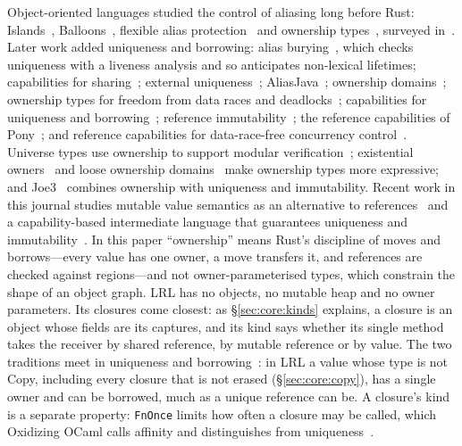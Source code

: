 Object-oriented languages studied the control of aliasing long before Rust: Islands~\cite{hogg1991islands}, Balloons~\cite{almeida1997balloon}, flexible alias protection~\cite{noble1998flexible} and ownership types~\cite{clarke1998ownership}, surveyed in~\cite{clarke2013survey}.
Later work added uniqueness and borrowing: alias burying~\cite{boyland2001burying}, which checks uniqueness with a liveness analysis and so anticipates non-lexical lifetimes; capabilities for sharing~\cite{boyland2001capabilities}; external uniqueness~\cite{clarke2003external}; AliasJava~\cite{aldrich2002alias}; ownership domains~\cite{aldrich2004domains}; ownership types for freedom from data races and deadlocks~\cite{boyapati2002ownership}; capabilities for uniqueness and borrowing~\cite{haller2010capabilities}; reference immutability~\cite{gordon2012uniqueness}; the reference capabilities of Pony~\cite{clebsch2015deny}; and reference capabilities for data-race-free concurrency control~\cite{castegren2016reference}.
Universe types use ownership to support modular verification~\cite{muller2002modular,dietl2005universes,dietl2007generic}; existential owners~\cite{wrigstad2007existential} and loose ownership domains~\cite{schaefer2007loose} make ownership types more expressive; and Joe3~\cite{ostlund2008ownership} combines ownership with uniqueness and immutability.
Recent work in this journal studies mutable value semantics as an alternative to references~\cite{racordon2022mvs} and a capability-based intermediate language that guarantees uniqueness and immutability~\cite{racordon2022lingua}.
In this paper ``ownership'' means Rust's discipline of moves and borrows---every value has one owner, a move transfers it, and references are checked against regions---and not owner-parameterised types, which constrain the shape of an object graph.
LRL has no objects, no mutable heap and no owner parameters.
Its closures come closest: as \S\ref{sec:core:kinds} explains, a closure is an object whose fields are its captures, and its kind says whether its single method takes the receiver by shared reference, by mutable reference or by value.
The two traditions meet in uniqueness and borrowing~\cite{boyland2001burying,haller2010capabilities}: in LRL a value whose type is not Copy, including every closure that is not erased (\S\ref{sec:core:copy}), has a single owner and can be borrowed, much as a unique reference can be. A closure's kind is a separate property: \lstinline|FnOnce| limits how often a closure may be called, which Oxidizing OCaml calls affinity and distinguishes from uniqueness~\cite{lorenzen2024oxidizing}.

